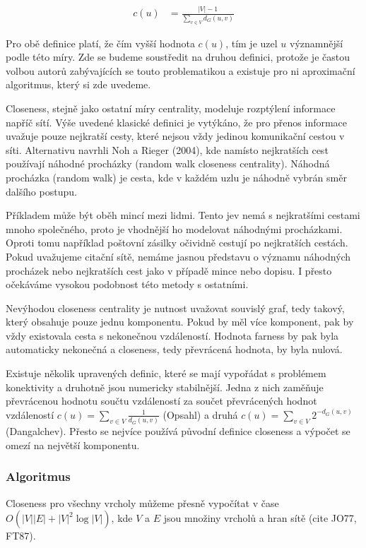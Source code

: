 \documentclass{bakalarka}
\begin{document}
\begin{align*}
c(u) &= \frac{|V| - 1}{\sum_{v \in V} d_G(u, v)}
\end{align*}

Pro obě definice platí, že čím vyšší hodnota $c(u)$, tím je uzel $u$
významnější podle této míry. Zde se budeme soustředit na druhou definici,
protože je častou volbou autorů zabývajících se touto problematikou a existuje
pro ni aproximační algoritmus, který si zde uvedeme.

Closeness, stejně jako ostatní míry centrality, modeluje rozptýlení informace
napříč sítí. Výše uvedené klasické definici je vytýkáno, že pro přenos
informace uvažuje pouze nejkratší cesty, které nejsou vždy jedinou komunikační
cestou v síti. Alternativu navrhli Noh a Rieger (2004), kde namísto nejkratších
cest používají náhodné procházky (random walk closeness centrality). Náhodná
procházka (random walk) je cesta, kde v každém uzlu je náhodně vybrán směr
dalšího postupu.

Příkladem může být oběh mincí mezi lidmi. Tento jev nemá s nejkratšími cestami
mnoho společného, proto je vhodnější ho modelovat náhodnými procházkami. Oproti
tomu například poštovní zásilky očividně cestují po nejkratších cestách. Pokud
uvažujeme citační sítě, nemáme jasnou představu o významu náhodných procházek
nebo nejkratších cest jako v případě mince nebo dopisu. I přesto očekáváme
vysokou podobnost této metody s ostatními.

Nevýhodou closeness centrality je nutnost uvažovat souvislý graf, tedy takový,
který obsahuje pouze jednu komponentu. Pokud by měl více komponent, pak by vždy
existovala cesta s nekonečnou vzdáleností. Hodnota farness by pak byla
automaticky nekonečná a closeness, tedy převrácená hodnota, by byla nulová. 

Existuje několik upravených definic, které se mají vypořádat s problémem
konektivity a druhotně jsou numericky stabilnější. Jedna z nich zaměňuje
převrácenou hodnotu součtu vzdáleností za součet převrácených hodnot
vzdáleností $c(u) = \sum_{v \in V} \frac{1}{d_G(u, v)}$ (Opsahl) a druhá $c(u)
= \sum_{v \in V} 2^{-d_G(u, v)}$ (Dangalchev). Přesto se nejvíce používá
původní definice closeness a výpočet se omezí na největší komponentu.


\subsubsection{Algoritmus}
Closeness pro všechny vrcholy můžeme přesně vypočítat v čase $O(|V||E| +
|V|^2\log|V|)$, kde $V$ a $E$ jsou množiny vrcholů a hran sítě (cite JO77,
FT87). 
\end{document}
